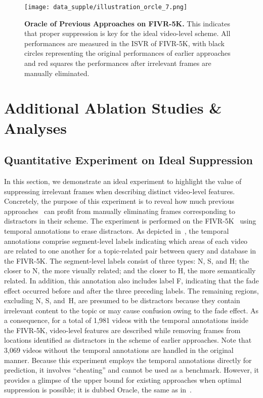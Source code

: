 \documentclass[10pt,twocolumn,letterpaper]{article}
\begin{document}
         
   
        \begin{figure}[!t]
            \centering
            \texttt{[image: data\_supple/illustration\_orcle\_7.png]} 
            \caption{\textbf{Oracle of Previous Approaches on FIVR-5K.} This indicates that proper suppression is key for the ideal video-level scheme. All performances are measured in the ISVR of FIVR-5K, with black circles representing the original performances of earlier approaches and red squares the performances after irrelevant frames are manually eliminated. \vspace{-0mm}} \label{fig:oracle}
        \end{figure}
        
\section{Additional Ablation Studies \& Analyses}\label{ablation_analyses}
    \subsection{Quantitative Experiment on Ideal Suppression}\label{quan_exp}
        
        In this section, we demonstrate an ideal experiment to highlight the value of suppressing irrelevant frames when describing distinct video-level features. Concretely, the purpose of this experiment is to reveal how much previous approaches~\cite{kordopatis2017near, shao2021temporal, ng2022vrag} can profit from manually eliminating frames corresponding to distractors in their scheme. The experiment is performed on the FIVR-5K~\cite{kordopatis2019fivr} using temporal annotations to erase distractors. As depicted in~, the temporal annotations comprise segment-level labels indicating which areas of each video are related to one another for a topic-related pair between query and database in the FIVR-5K. The segment-level labels consist of three types: N, S, and H; the closer to N, the more visually related; and the closer to H, the more semantically related. In addition, this annotation also includes label F, indicating that the fade effect occurred before and after the three preceding labels. The remaining regions, excluding N, S, and~H, are presumed to be distractors because they contain irrelevant content to the topic or may cause confusion owing to the fade effect. As a consequence, for a total of 1,981 videos with the temporal annotations inside the FIVR-5K, video-level features are described while removing frames from locations identified as distractors in the scheme of earlier approaches. Note that 3,069 videos without the temporal annotations are handled in the original manner. Because this experiment employs the temporal annotations directly for prediction, it involves ``cheating'' and cannot be used as a benchmark. However, it provides a glimpse of the upper bound for existing approaches when optimal suppression is possible; it is dubbed Oracle, the same as in~\cite{huang2018makes}.
\end{document}
